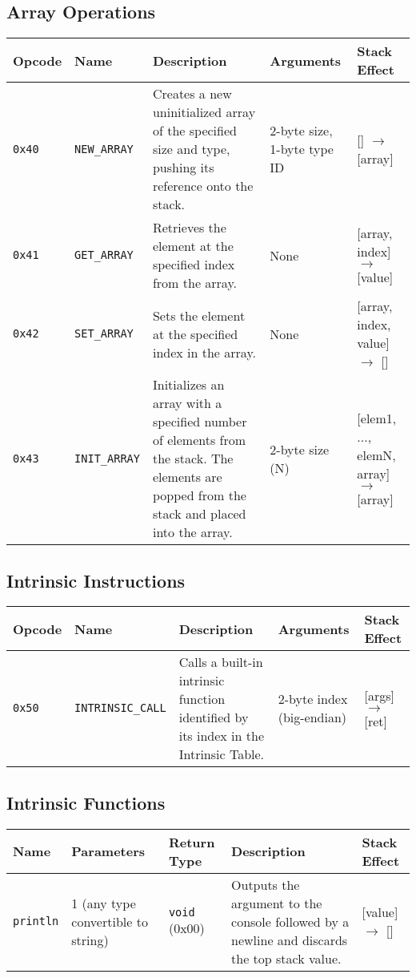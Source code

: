 \documentclass[a4paper,12pt]{article}
\begin{document}
    \subsection{Array Operations}
    \begin{tabular}{|l|l|p{4cm}|p{4cm}|p{4cm}|}
        \hline
        \textbf{Opcode} & \textbf{Name} & \textbf{Description} & \textbf{Arguments} & \textbf{Stack Effect} \\ \hline
        \texttt{0x40} & \texttt{NEW\_ARRAY} & Creates a new uninitialized array of the specified size and type, pushing its reference onto the stack. & 2-byte size, 1-byte type ID & [] $\rightarrow$ [array] \\ \hline
        \texttt{0x41} & \texttt{GET\_ARRAY} & Retrieves the element at the specified index from the array. & None & [array, index] $\rightarrow$ [value] \\ \hline
        \texttt{0x42} & \texttt{SET\_ARRAY} & Sets the element at the specified index in the array. & None & [array, index, value] $\rightarrow$ [] \\ \hline
        \texttt{0x43} & \texttt{INIT\_ARRAY} & Initializes an array with a specified number of elements from the stack. The elements are popped from the stack and placed into the array. & 2-byte size (N) & [elem1, ..., elemN, array] $\rightarrow$ [array] \\ \hline
    \end{tabular}
    \label{tab:array_operations}

    \subsection{Intrinsic Instructions}
    \begin{tabular}{|l|l|p{4cm}|l|l|}
        \hline
        \textbf{Opcode} & \textbf{Name} & \textbf{Description} & \textbf{Arguments} & \textbf{Stack Effect} \\ \hline
        \texttt{0x50} & \texttt{INTRINSIC\_CALL} & Calls a built-in intrinsic function identified by its index in the Intrinsic Table. & 2-byte index (big-endian) & [args] $\rightarrow$ [ret] \\ \hline
    \end{tabular}
    \label{tab:intrinsic_instructions}

    \subsection{Intrinsic Functions}
    \begin{tabular}{|l|l|l|p{4cm}|l|}
        \hline
        \textbf{Name} & \textbf{Parameters} & \textbf{Return Type} & \textbf{Description} & \textbf{Stack Effect} \\ \hline
        \texttt{println} & 1 (any type convertible to string) & \texttt{void} (0x00) & Outputs the argument to the console followed by a newline and discards the top stack value. & [value] $\rightarrow$ [] \\ \hline
    \end{tabular}
    \label{tab:intrinsic_functions}
\end{document}
